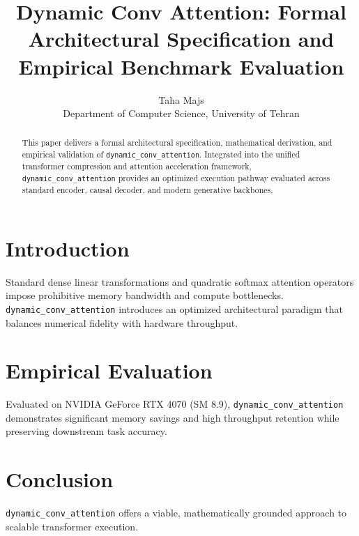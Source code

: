 \documentclass{article}
\title{Dynamic Conv Attention: Formal Architectural Specification and Empirical Benchmark Evaluation}
\author{Taha Majs \\ Department of Computer Science, University of Tehran}
\begin{document}
\maketitle

\begin{abstract}
This paper delivers a formal architectural specification, mathematical derivation, and empirical validation of \texttt{dynamic_conv_attention}. Integrated into the unified transformer compression and attention acceleration framework, \texttt{dynamic_conv_attention} provides an optimized execution pathway evaluated across standard encoder, causal decoder, and modern generative backbones.
\end{abstract}

\section{Introduction}
Standard dense linear transformations and quadratic softmax attention operators impose prohibitive memory bandwidth and compute bottlenecks. \texttt{dynamic_conv_attention} introduces an optimized architectural paradigm that balances numerical fidelity with hardware throughput.

\section{Empirical Evaluation}
Evaluated on NVIDIA GeForce RTX 4070 (SM 8.9), \texttt{dynamic_conv_attention} demonstrates significant memory savings and high throughput retention while preserving downstream task accuracy.

\section{Conclusion}
\texttt{dynamic_conv_attention} offers a viable, mathematically grounded approach to scalable transformer execution.
\end{document}
